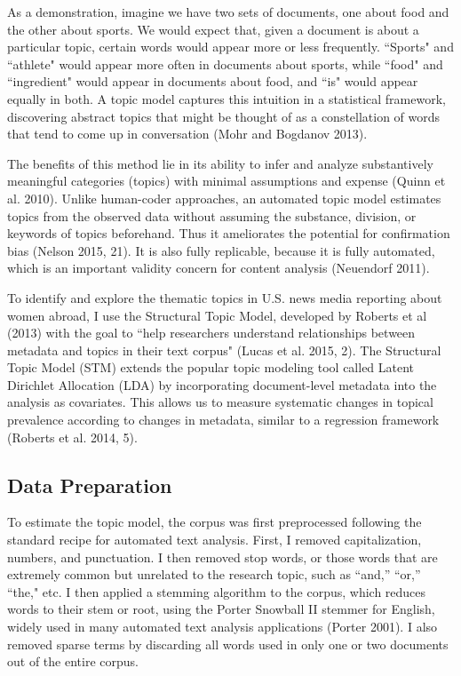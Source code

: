 \documentclass[11pt, oneside]{article}
\begin{document}
As a demonstration, imagine we have two sets of documents, one about food and the other about sports. We would expect that, given a document is about a particular topic, certain words would appear more or less frequently. ``Sports" and ``athlete" would appear more often in documents about sports, while ``food" and ``ingredient" would appear in documents about food, and ``is" would appear equally in both. A topic model captures this intuition in a statistical framework, discovering abstract topics that might be thought of as a constellation of words that tend to come up in conversation (Mohr and Bogdanov 2013). 

The benefits of this method lie in its ability to infer and analyze substantively meaningful categories (topics) with minimal assumptions and expense (Quinn et al. 2010). Unlike human-coder approaches, an automated topic model estimates topics from the observed data without assuming the substance, division, or keywords of topics beforehand. Thus it ameliorates the potential for confirmation bias (Nelson 2015, 21). It is also fully replicable, because it is fully automated, which is an important validity concern for content analysis (Neuendorf 2011). 

To identify and explore the thematic topics in U.S. news media reporting about women abroad, I use the Structural Topic Model, developed by Roberts et al (2013) with the goal to ``help researchers understand relationships between metadata and topics in their text corpus" (Lucas et al. 2015, 2). The Structural Topic Model (STM) extends the popular topic modeling tool called Latent Dirichlet Allocation (LDA) by incorporating document-level metadata into the analysis as covariates. This allows us to measure systematic changes in topical prevalence according to changes in metadata, similar to a regression framework (Roberts et al. 2014, 5). 

\subsection{Data Preparation}

To estimate the topic model, the corpus was first preprocessed following the standard recipe for automated text analysis. First, I removed capitalization, numbers, and punctuation. I then removed stop words, or those words that are extremely common but unrelated to the research topic, such as ``and,'' ``or,'' ``the," etc.  I then applied a stemming algorithm to the corpus, which reduces words to their stem or root, using the Porter Snowball II stemmer for English, widely used in many automated text analysis applications (Porter 2001). I also removed sparse terms by discarding all words used in only one or two documents out of the entire corpus. 
\end{document}
